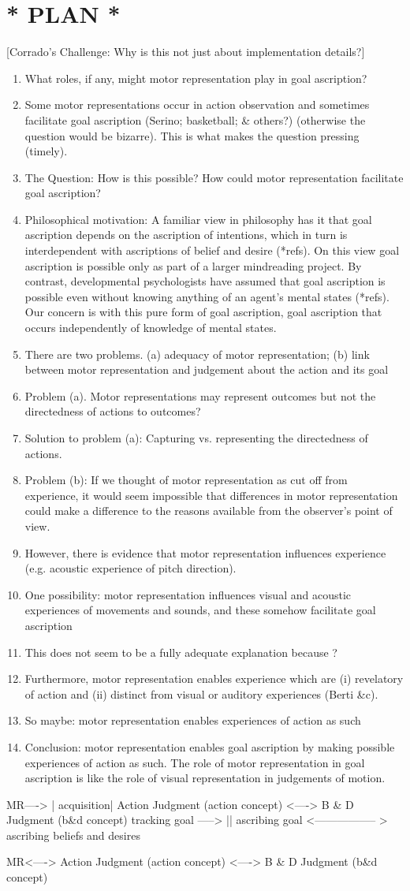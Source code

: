 \documentclass[12pt,\papersize]{extarticle}
\begin{document}
\section{* PLAN *}
[Corrado's Challenge: Why is this not just about implementation details?]
\begin{enumerate}
\item What roles, if any, might motor representation play in goal ascription?
\item Some motor representations occur in action observation and sometimes facilitate goal ascription (Serino; basketball; \& others?) (otherwise the question would be bizarre).  This is what makes the question pressing (timely).
\item The Question: How is this possible?  How could motor representation facilitate goal ascription?
\item Philosophical motivation: A familiar view in philosophy has it that goal ascription depends on the ascription of intentions, which in turn is interdependent with ascriptions of belief and desire (*refs). On this view goal ascription is possible only as part of a larger mindreading project. By contrast, developmental psychologists have assumed that goal ascription is possible even without knowing anything of an agent's mental states (*refs).  Our concern is with this pure form of goal ascription, goal ascription that occurs independently of knowledge of mental states.
\item There are two problems.  (a) adequacy of motor representation; (b) link between motor representation and judgement about the action and its goal
\item Problem (a).  Motor representations may represent outcomes but not the directedness of actions to outcomes?
\item Solution to problem (a): Capturing vs. representing the directedness of actions.
\item Problem (b): If we thought of motor representation as cut off from experience, it would seem impossible that differences in motor representation could make a difference to the reasons available from the observer's point of view.  
\item However, there is evidence that motor representation influences experience (e.g. acoustic experience of pitch direction).
\item One possibility: motor representation influences visual and acoustic experiences of movements and sounds, and these somehow facilitate goal ascription
\item This does not seem to be a fully adequate explanation because ?
\item Furthermore, motor representation enables experience which are (i) revelatory of action and (ii) distinct from visual or auditory experiences (Berti \&c).
\item So maybe: motor representation enables experiences of action as such
\item Conclusion: motor representation enables goal ascription by making possible experiences of action as such.  The role of motor representation in goal ascription is like the role of visual representation in judgements of motion.
\end{enumerate}

MR----> | acquisition| Action Judgment (action concept) <----> B \& D Judgment (b\&d concept)
tracking goal -----> || ascribing goal <----------------- > ascribing beliefs and desires

MR<----> Action Judgment (action concept) <----> B \& D Judgment (b\&d concept)
\end{document}
